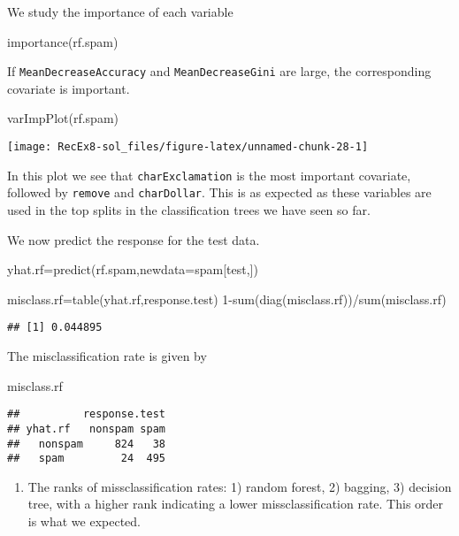 \documentclass[
]{article}
\newenvironment{Shaded}{\begin{snugshade}}{\end{snugshade}}
\newcommand{\AttributeTok}[1]{\textcolor[rgb]{0.77,0.63,0.00}{#1}}
\newcommand{\DecValTok}[1]{\textcolor[rgb]{0.00,0.00,0.81}{#1}}
\newcommand{\FunctionTok}[1]{\textcolor[rgb]{0.00,0.00,0.00}{#1}}
\newcommand{\NormalTok}[1]{#1}
\newcommand{\OtherTok}[1]{\textcolor[rgb]{0.56,0.35,0.01}{#1}}
\newcommand{\SpecialCharTok}[1]{\textcolor[rgb]{0.00,0.00,0.00}{#1}}
\providecommand{\tightlist}{%
  \setlength{\itemsep}{0pt}\setlength{\parskip}{0pt}}
\begin{document}
We study the importance of each variable

\begin{Shaded}
\begin{Highlighting}[]
\FunctionTok{importance}\NormalTok{(rf.spam)}
\end{Highlighting}
\end{Shaded}

If \texttt{MeanDecreaseAccuracy} and \texttt{MeanDecreaseGini} are
large, the corresponding covariate is important.

\begin{Shaded}
\begin{Highlighting}[]
\FunctionTok{varImpPlot}\NormalTok{(rf.spam)}
\end{Highlighting}
\end{Shaded}

\texttt{[image: RecEx8-sol\_files/figure-latex/unnamed-chunk-28-1]}

In this plot we see that \texttt{charExclamation} is the most important
covariate, followed by \texttt{remove} and \texttt{charDollar}. This is
as expected as these variables are used in the top splits in the
classification trees we have seen so far.

We now predict the response for the test data.

\begin{Shaded}
\begin{Highlighting}[]
\NormalTok{yhat.rf}\OtherTok{=}\FunctionTok{predict}\NormalTok{(rf.spam,}\AttributeTok{newdata=}\NormalTok{spam[test,])}

\NormalTok{misclass.rf}\OtherTok{=}\FunctionTok{table}\NormalTok{(yhat.rf,response.test)}
\DecValTok{1}\SpecialCharTok{{-}}\FunctionTok{sum}\NormalTok{(}\FunctionTok{diag}\NormalTok{(misclass.rf))}\SpecialCharTok{/}\FunctionTok{sum}\NormalTok{(misclass.rf)}
\end{Highlighting}
\end{Shaded}

\begin{verbatim}
## [1] 0.044895
\end{verbatim}

The misclassification rate is given by

\begin{Shaded}
\begin{Highlighting}[]
\NormalTok{misclass.rf}
\end{Highlighting}
\end{Shaded}

\begin{verbatim}
##          response.test
## yhat.rf   nonspam spam
##   nonspam     824   38
##   spam         24  495
\end{verbatim}

\begin{enumerate}
\def\labelenumi{\alph{enumi})}
\setcounter{enumi}{7}
\tightlist
\item
  The ranks of missclassification rates: 1) random forest, 2) bagging,
  3) decision tree, with a higher rank indicating a lower
  missclassification rate. This order is what we expected.
\end{enumerate}
\end{document}
